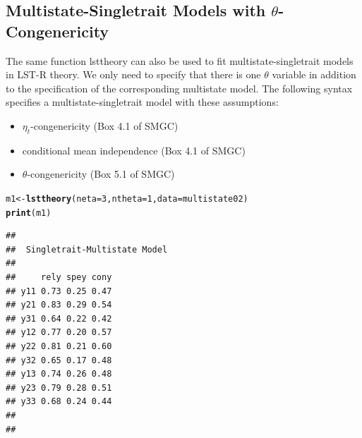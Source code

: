 \documentclass[10pt]{article}\usepackage{graphicx, color}
\makeatletter
\newcommand{\hlfunctioncall}[1]{\textcolor[rgb]{0.501960784313725,0,0.329411764705882}{\textbf{#1}}}%
\newenvironment{kframe}{%
 \def\at@end@of@kframe{}%
 \ifinner\ifhmode%
  \def\at@end@of@kframe{\end{minipage}}%
  \begin{minipage}{\columnwidth}%
 \fi\fi%
 \def\FrameCommand##1{\hskip\@totalleftmargin \hskip-\fboxsep
 \colorbox{shadecolor}{##1}\hskip-\fboxsep
     \hskip-\linewidth \hskip-\@totalleftmargin \hskip\columnwidth}%
 \MakeFramed {\advance\hsize-\width
   \@totalleftmargin\z@ \linewidth\hsize
   \@setminipage}}%
 {\par\unskip\endMakeFramed%
 \at@end@of@kframe}
\newenvironment{knitrout}{}{} %
\makeatother
\begin{document}
\subsection{Multistate-Singletrait Models with $\theta$-Congenericity}

The same function lsttheory can also be used to fit multistate-singletrait models in LST-R theory. We only need to specify that there is one $\theta$ variable in addition to the specification of the corresponding multistate model. The following syntax specifies a multistate-singletrait model with these assumptions:
%
\begin{itemize}
  \item $\eta_t$-congenericity (Box 4.1 of SMGC)
  \item conditional mean independence (Box 4.1 of SMGC)
  \item $\theta$-congenericity (Box 5.1 of SMGC)
\end{itemize}
%
\begin{knitrout}
\color{fgcolor}\begin{kframe}
\begin{alltt}
m1 <- \hlfunctioncall{lsttheory}(neta = 3, ntheta = 1, data = multistate02)
\hlfunctioncall{print}(m1)
\end{alltt}
\begin{verbatim}
## 
##  Singletrait-Multistate Model 
##  
##     rely spey cony
## y11 0.73 0.25 0.47
## y21 0.83 0.29 0.54
## y31 0.64 0.22 0.42
## y12 0.77 0.20 0.57
## y22 0.81 0.21 0.60
## y32 0.65 0.17 0.48
## y13 0.74 0.26 0.48
## y23 0.79 0.28 0.51
## y33 0.68 0.24 0.44
## 
## 
\end{verbatim}
\end{kframe}
\end{knitrout}
\end{document}
